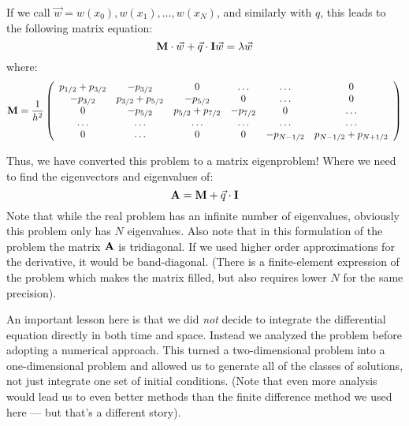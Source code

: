 If we call $\vec{w} = {w(x_0), w(x_1), \ldots, w(x_N)}$, and similarly
with $q$, this leads to the following matrix equation:
\begin{equation}
{\bf M}\cdot \vec{w} + \vec{q}\cdot{\ensuremath{{\bf I}}}\vec{w} = \lambda \vec{w}
\end{equation}
where:
\begin{equation}
  {\bf M} = \frac{1}{h^2} \left(\begin{array}{cccccc}
    p_{1/2} + p_{3/2} & - p_{3/2} & 0 & \ldots & \ldots & 0 \cr
    - p_{3/2} & p_{3/2} + p_{5/2} & -p_{5/2} & 0 & \ldots & 0 \cr
    0 & - p_{5/2} & p_{5/2} + p_{7/2} & -p_{7/2} & 0 & \ldots \cr
    \ldots & \ldots & \ldots & \ldots & \ldots & \ldots \cr
    0 & \ldots & 0 & 0 & - p_{N-1/2}  & p_{N-1/2} + p_{N+1/2} 
\end{array}\right)
\end{equation}

Thus, we have converted this problem to a matrix eigenproblem!  Where
we need to find the eigenvectors and eigenvalues of:
\begin{equation}
{\bf A} = {\bf M} + \vec{q}\cdot{\bf I}
\end{equation}
Note that while the real problem has an infinite number of
eigenvalues, obviously this problem only has $N$ eigenvalues. Also
note that in this formulation of the problem the   matrix ${\bf A}$ is
tridiagonal. If we used higher order approximations for the
derivative, it would be band-diagonal. (There is a finite-element
expression of the problem which makes the matrix filled, but also
requires lower $N$ for the same precision).

An important lesson here is that we did {\it not} decide to integrate
the differential equation directly in both time and space. Instead we
analyzed the problem before adopting a numerical approach. This turned
a two-dimensional problem into a one-dimensional problem and allowed
us to generate all of the classes of solutions, not just integrate
one set of initial conditions. (Note that even more analysis would
lead us to even better methods than the finite difference method we
used here --- but that's a different story).

